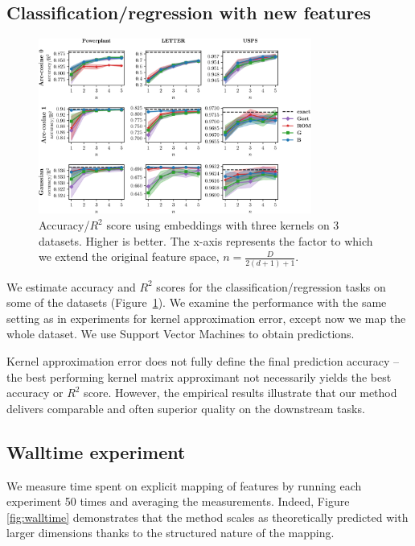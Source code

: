 \subsection{Classification/regression with new features}
\label{sub:finalscore}
\begin{figure}[h]
\centering
\includegraphics[width=0.8\textwidth]{figures/quadratures/Powerplant_LETTER_USPSacc_plain}
\caption{Accuracy/$R^2$ score using embeddings with three kernels on 3 datasets. Higher is better.
The x-axis represents the factor to which we extend the original feature space, $n = \frac{D}{2(d+1)+1}$.}
\label{fig:acc}
\end{figure}

We estimate accuracy and $R^2$ scores for the classification/regression tasks on some of the datasets (Figure~\ref{fig:acc}).
We examine the performance with the same setting as in experiments for kernel approximation error, except now we map the whole dataset.
We use Support Vector Machines to obtain predictions.

Kernel approximation error does not fully define the final prediction accuracy -- the best performing kernel matrix approximant not necessarily yields the best accuracy or $R^2$ score. However, the empirical results illustrate that our method delivers comparable and often superior quality on the downstream tasks.

\subsection{Walltime experiment}
We measure time spent on explicit mapping of features by running each experiment 50 times and averaging the measurements.  Indeed, Figure \ref{fig:walltime} demonstrates that the method scales as theoretically predicted with larger dimensions thanks to the structured nature of the mapping.

